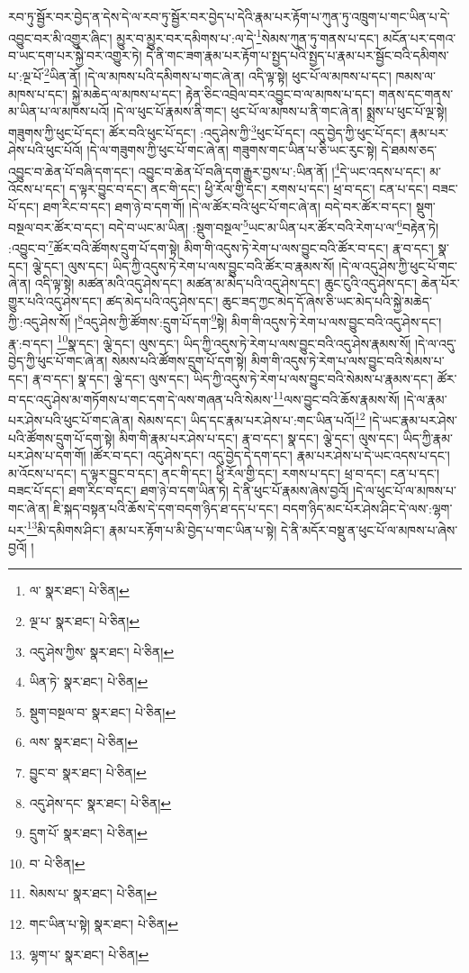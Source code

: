 རབ་ཏུ་སྦྱོར་བར་བྱེད་ན་དེས་དེ་ལ་རབ་ཏུ་སྦྱོར་བར་བྱེད་པ་དེའི་རྣམ་པར་རྟོག་པ་ཀུན་ཏུ་འཁྲུག་པ་གང་ཡིན་པ་དེ་འབྱུང་བར་མི་འགྱུར་ཞིང་། མྱུར་བ་མྱུར་བར་དམིགས་པ་:ལ་དེ་\footnote{ལ་  སྣར་ཐང་།  པེ་ཅིན། }སེམས་ཀུན་ཏུ་གནས་པ་དང་། མངོན་པར་དགའ་བ་ཡང་དག་པར་སྐྱེ་བར་འགྱུར་ཏེ། དེ་ནི་གང་ཟག་རྣམ་པར་རྟོག་པ་སྤྱད་པའི་སྤྱད་པ་རྣམ་པར་སྦྱོང་བའི་དམིགས་པ་:ལྔ་པོ་\footnote{ལྔ་པ་  སྣར་ཐང་།  པེ་ཅིན། }ཡིན་ནོ། །དེ་ལ་མཁས་པའི་དམིགས་པ་གང་ཞེ་ན། འདི་ལྟ་སྟེ། ཕུང་པོ་ལ་མཁས་པ་དང་། ཁམས་ལ་མཁས་པ་དང་། སྐྱེ་མཆེད་ལ་མཁས་པ་དང་། རྟེན་ཅིང་འབྲེལ་བར་འབྱུང་བ་ལ་མཁས་པ་དང་། གནས་དང་གནས་མ་ཡིན་པ་ལ་མཁས་པའོ། །དེ་ལ་ཕུང་པོ་རྣམས་ནི་གང་། ཕུང་པོ་ལ་མཁས་པ་ནི་གང་ཞེ་ན། སྨྲས་པ་ཕུང་པོ་ལྔ་སྟེ། གཟུགས་ཀྱི་ཕུང་པོ་དང་། ཚོར་བའི་ཕུང་པོ་དང་། :འདུ་ཤེས་ཀྱི་\footnote{འདུ་ཤེས་ཀྱིས་  སྣར་ཐང་།  པེ་ཅིན། }ཕུང་པོ་དང་། འདུ་བྱེད་ཀྱི་ཕུང་པོ་དང་། རྣམ་པར་ཤེས་པའི་ཕུང་པོའོ། །དེ་ལ་གཟུགས་ཀྱི་ཕུང་པོ་གང་ཞེ་ན། གཟུགས་གང་ཡིན་པ་ཅི་ཡང་རུང་སྟེ། དེ་ཐམས་ཅད་འབྱུང་བ་ཆེན་པོ་བཞི་དག་དང་། འབྱུང་བ་ཆེན་པོ་བཞི་དག་རྒྱུར་བྱས་པ་:ཡིན་ནོ། །\footnote{ཡིན་ཏེ་  སྣར་ཐང་།  པེ་ཅིན། }དེ་ཡང་འདས་པ་དང་། མ་འོངས་པ་དང་། ད་ལྟར་བྱུང་བ་དང་། ནང་གི་དང་། ཕྱི་རོལ་གྱི་དང་། རགས་པ་དང་། ཕྲ་བ་དང་། ངན་པ་དང་། བཟང་པོ་དང་། ཐག་རིང་བ་དང་། ཐག་ཉེ་བ་དག་གོ། །དེ་ལ་ཚོར་བའི་ཕུང་པོ་གང་ཞེ་ན། བདེ་བར་ཚོར་བ་དང་། སྡུག་བསྔལ་བར་ཚོར་བ་དང་། བདེ་བ་ཡང་མ་ཡིན། :སྡུག་བསྔལ་\footnote{སྡུག་བསྔལ་བ་  སྣར་ཐང་།  པེ་ཅིན། }ཡང་མ་ཡིན་པར་ཚོར་བའི་རེག་པ་ལ་\footnote{ལས་  སྣར་ཐང་།  པེ་ཅིན། }བརྟེན་ཏེ། :འབྱུང་བ་\footnote{བྱུང་བ་  སྣར་ཐང་།  པེ་ཅིན། }ཚོར་བའི་ཚོགས་དྲུག་པོ་དག་སྟེ། མིག་གི་འདུས་ཏེ་རེག་པ་ལས་བྱུང་བའི་ཚོར་བ་དང་། རྣ་བ་དང་། སྣ་དང་། ལྕེ་དང་། ལུས་དང་། ཡིད་ཀྱི་འདུས་ཏེ་རེག་པ་ལས་བྱུང་བའི་ཚོར་བ་རྣམས་སོ། །དེ་ལ་འདུ་ཤེས་ཀྱི་ཕུང་པོ་གང་ཞེ་ན། འདི་ལྟ་སྟེ། མཚན་མའི་འདུ་ཤེས་དང་། མཚན་མ་མེད་པའི་འདུ་ཤེས་དང་། ཆུང་ངུའི་འདུ་ཤེས་དང་། ཆེན་པོར་གྱུར་པའི་འདུ་ཤེས་དང་། ཚད་མེད་པའི་འདུ་ཤེས་དང་། ཆུང་ཟད་ཀྱང་མེད་དོ་ཞེས་ཅི་ཡང་མེད་པའི་སྐྱེ་མཆེད་ཀྱི་:འདུ་ཤེས་སོ། །\footnote{འདུ་ཤེས་དང་  སྣར་ཐང་།  པེ་ཅིན། }འདུ་ཤེས་ཀྱི་ཚོགས་:དྲུག་པོ་དག་\footnote{དྲུག་པོ་  སྣར་ཐང་།  པེ་ཅིན། }སྟེ། མིག་གི་འདུས་ཏེ་རེག་པ་ལས་བྱུང་བའི་འདུ་ཤེས་དང་། རྣ་:བ་དང་། \footnote{བ་  པེ་ཅིན། }སྣ་དང་། ལྕེ་དང་། ལུས་དང་། ཡིད་ཀྱི་འདུས་ཏེ་རེག་པ་ལས་བྱུང་བའི་འདུ་ཤེས་རྣམས་སོ། །དེ་ལ་འདུ་བྱེད་ཀྱི་ཕུང་པོ་གང་ཞེ་ན། སེམས་པའི་ཚོགས་དྲུག་པོ་དག་སྟེ། མིག་གི་འདུས་ཏེ་རེག་པ་ལས་བྱུང་བའི་སེམས་པ་དང་། རྣ་བ་དང་། སྣ་དང་། ལྕེ་དང་། ལུས་དང་། ཡིད་ཀྱི་འདུས་ཏེ་རེག་པ་ལས་བྱུང་བའི་སེམས་པ་རྣམས་དང་། ཚོར་བ་དང་འདུ་ཤེས་མ་གཏོགས་པ་གང་དག་དེ་ལས་གཞན་པའི་སེམས་\footnote{སེམས་པ་  སྣར་ཐང་།  པེ་ཅིན། }ལས་བྱུང་བའི་ཆོས་རྣམས་སོ། །དེ་ལ་རྣམ་པར་ཤེས་པའི་ཕུང་པོ་གང་ཞེ་ན། སེམས་དང་། ཡིད་དང་རྣམ་པར་ཤེས་པ་:གང་ཡིན་པའོ།\footnote{གང་ཡིན་པ་སྟེ།  སྣར་ཐང་།  པེ་ཅིན། } །དེ་ཡང་རྣམ་པར་ཤེས་པའི་ཚོགས་དྲུག་པོ་དག་སྟེ། མིག་གི་རྣམ་པར་ཤེས་པ་དང་། རྣ་བ་དང་། སྣ་དང་། ལྕེ་དང་། ལུས་དང་། ཡིད་ཀྱི་རྣམ་པར་ཤེས་པ་དག་གོ། །ཚོར་བ་དང་། འདུ་ཤེས་དང་། འདུ་བྱེད་དེ་དག་དང་། རྣམ་པར་ཤེས་པ་དེ་ཡང་འདས་པ་དང་། མ་འོངས་པ་དང་། ད་ལྟར་བྱུང་བ་དང་། ནང་གི་དང་། ཕྱི་རོལ་གྱི་དང་། རགས་པ་དང་། ཕྲ་བ་དང་། ངན་པ་དང་། བཟང་པོ་དང་། ཐག་རིང་བ་དང་། ཐག་ཉེ་བ་དག་ཡིན་ཏེ། དེ་ནི་ཕུང་པོ་རྣམས་ཞེས་བྱའོ། །དེ་ལ་ཕུང་པོ་ལ་མཁས་པ་གང་ཞེ་ན། ཇི་སྐད་བསྟན་པའི་ཆོས་དེ་དག་བདག་ཉིད་ཐ་དད་པ་དང་། བདག་ཉིད་མང་པོར་ཤེས་ཤིང་དེ་ལས་:ལྷག་པར་\footnote{ལྷག་པ་  སྣར་ཐང་།  པེ་ཅིན། }མི་དམིགས་ཤིང་། རྣམ་པར་རྟོག་པ་མི་བྱེད་པ་གང་ཡིན་པ་སྟེ། དེ་ནི་མདོར་བསྡུ་ན་ཕུང་པོ་ལ་མཁས་པ་ཞེས་བྱའོ། །
